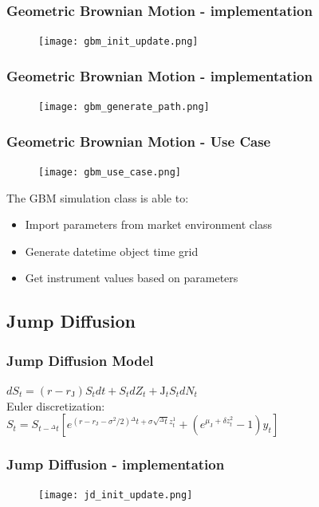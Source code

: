 \documentclass{beamer}
\begin{document}
\begin{frame}
\frametitle{Geometric Brownian Motion - implementation}
\begin{figure}[H]
	\texttt{[image: gbm\_init\_update.png]}
\end{figure}
\end{frame}

\begin{frame}
\frametitle{Geometric Brownian Motion - implementation}
\begin{figure}[H]
	\texttt{[image: gbm\_generate\_path.png]}
\end{figure}
\end{frame}

\begin{frame}
\frametitle{Geometric Brownian Motion - Use Case}
\begin{figure}[H]
	\texttt{[image: gbm\_use\_case.png]}
\end{figure}
The GBM simulation class is able to:
\begin{itemize}
	\item Import parameters from market environment class
	\item Generate datetime object time grid
	\item Get instrument values based on parameters
\end{itemize}
\end{frame}

\subsection{Jump Diffusion}
\begin{frame}
\frametitle{Jump Diffusion Model}
\begin{center}
$dS_{t} = (r-r_{\mathrm{J}})S_{t}dt + S_{t}dZ_{t}	+ {\mathrm{J}}_{t}S_{t}dN_{t}$\\[10mm]
	Euler discretization:\\[6mm]
	$S_{t} = S_{t-{^{\Delta}t}} [e^{(r-r_{\mathrm{J}}-\sigma^{2}/2){^{\Delta}t}+\sigma \sqrt{^{\Delta}t}z_{t}^{1}}+(e^{\mu_{\mathrm{J}}+\delta z_{t}^{2}}-1)y_{t}] $
\end{center}
\end{frame}

\begin{frame}
\frametitle{Jump Diffusion - implementation}
\begin{figure}[H]
	\texttt{[image: jd\_init\_update.png]}
\end{figure}
\end{frame}
\end{document}
